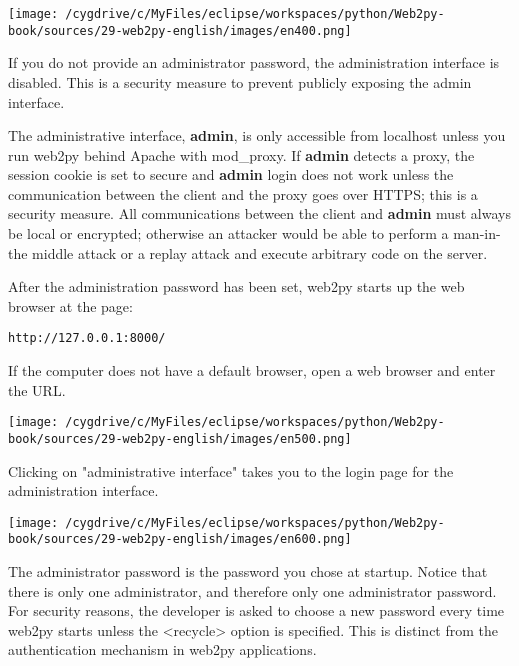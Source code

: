\documentclass[justified,sixbynine,notoc]{tufte-book}
\begin{document}
\begin{fullwidth}
\goodbreak\begin{center}\texttt{[image: /cygdrive/c/MyFiles/eclipse/workspaces/python/Web2py-book/sources/29-web2py-english/images/en400.png]}\end{center}


If you do not provide an administrator password, the administration interface is disabled. This is a security measure to prevent publicly exposing the admin interface.

The administrative interface, {\bf admin}, is only accessible from localhost unless you run web2py behind Apache with mod\_proxy. If {\bf admin} detects a proxy, the session cookie is set to secure and {\bf admin} login does not work unless the communication between the client and the proxy goes over HTTPS; this is a security measure. All communications between the client and {\bf admin} must always be local or encrypted; otherwise an attacker would be able to perform a man-in-the middle attack or a replay attack and execute arbitrary code on the server.

After the administration password has been set, web2py starts up the web browser at the page:
\begin{lstlisting}[keywords={}]
http://127.0.0.1:8000/
\end{lstlisting}

If the computer does not have a default browser, open a web browser and enter the URL.


\goodbreak\begin{center}\texttt{[image: /cygdrive/c/MyFiles/eclipse/workspaces/python/Web2py-book/sources/29-web2py-english/images/en500.png]}\end{center}


Clicking on "administrative interface" takes you to the login page for the administration interface.


\goodbreak\begin{center}\texttt{[image: /cygdrive/c/MyFiles/eclipse/workspaces/python/Web2py-book/sources/29-web2py-english/images/en600.png]}\end{center}


The administrator password is the password you chose at startup.
Notice that there is only one administrator, and therefore only one administrator password. For security reasons, the developer is asked to choose a new password every time web2py starts unless the <recycle> option is specified. This is distinct from the authentication mechanism in web2py applications.


\end{fullwidth}
\end{document}
